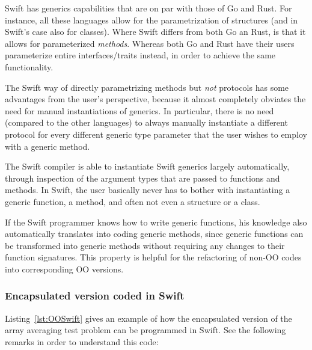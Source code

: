 \documentclass[11pt,oneside]{article}
\begin{document}
Swift has generics capabilities that are on par with those of Go and
Rust. For instance, all these languages allow for the parametrization
of structures (and in Swift's case also for classes). Where Swift
differs from both Go an Rust, is that it allows for parameterized
\emph{methods}. Whereas both Go and Rust have their users parameterize
entire interfaces/traits instead, in order to achieve the same
functionality.

The Swift way of directly parametrizing methods but \emph{not}
protocols has some advantages from the user's perspective, because it
almost completely obviates the need for manual instantiations of
generics. In particular, there is no need (compared to the other
languages) to always manually instantiate a different protocol for
every different generic type parameter that the user wishes to employ
with a generic method.

The Swift compiler is able to instantiate Swift generics largely
automatically, through inspection of the argument types that are
passed to functions and methods. In Swift, the user basically never
has to bother with instantiating a generic function, a method, and
often not even a structure or a class.

If the Swift programmer knows how to write generic functions, his
knowledge also automatically translates into coding generic methods,
since generic functions can be transformed into generic methods
without requiring any changes to their function signatures. This
property is helpful for the refactoring of non-OO codes into
corresponding OO versions.

\subsubsection{Encapsulated version coded in Swift}

Listing~\ref{lst:OOSwift} gives an example of how the encapsulated
version of the array averaging test problem can be programmed in
Swift. See the following remarks in order to understand this code:
\end{document}

